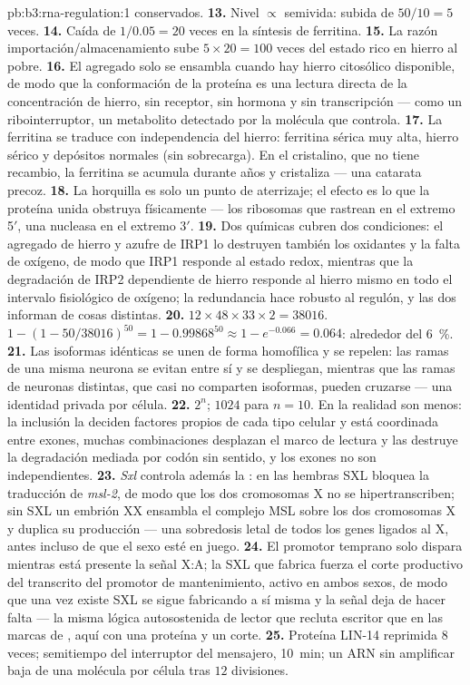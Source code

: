 \begin{solution}{pb:b3:rna-regulation:1}
conservados.
\textbf{13.} Nivel $\propto$ semivida: subida de $50/10 = 5$ veces.
\textbf{14.} Caída de $1/0.05 = 20$ veces en la síntesis de ferritina.
\textbf{15.} La razón importación/almacenamiento sube $5\times 20 = 100$
veces del estado rico en hierro al pobre.
\textbf{16.} El agregado solo se ensambla cuando hay hierro citosólico
disponible, de modo que la conformación de la proteína es una lectura
directa de la concentración de hierro, sin receptor, sin hormona y sin
transcripción --- como un ribointerruptor, un metabolito detectado por la
molécula que controla.
\textbf{17.} La ferritina se traduce con independencia del hierro:
ferritina sérica muy alta, hierro sérico y depósitos normales (sin
sobrecarga). En el cristalino, que no tiene recambio, la ferritina se
acumula durante años y cristaliza --- una catarata precoz.
\textbf{18.} La horquilla es solo un punto de aterrizaje; el efecto es lo
que la proteína unida obstruya físicamente --- los ribosomas que rastrean
en el extremo 5$'$, una nucleasa en el extremo 3$'$.
\textbf{19.} Dos químicas cubren dos condiciones: el agregado de hierro y
azufre de IRP1 lo destruyen también los oxidantes y la falta de oxígeno,
de modo que IRP1 responde al estado redox, mientras que la degradación de
IRP2 dependiente de hierro responde al hierro mismo en todo el intervalo
fisiológico de oxígeno; la redundancia hace robusto al regulón, y las dos
informan de cosas distintas.
\textbf{20.} $12\times 48\times 33\times 2 = \num{38016}$. $1 - (1 -
50/\num{38016})^{50} = 1 - 0.99868^{50} \approx 1 - e^{-0.066} =
0.064$: alrededor del \qty{6}{\%}.
\textbf{21.} Las isoformas idénticas se unen de forma homofílica y se
repelen: las ramas de una misma neurona se evitan entre sí y se
despliegan, mientras que las ramas de neuronas distintas, que casi no
comparten isoformas, pueden cruzarse --- una identidad privada por
célula.
\textbf{22.} $2^{n}$; $\num{1024}$ para $n = 10$. En la realidad son
menos: la inclusión la deciden factores propios de cada tipo celular y
está coordinada entre exones, muchas combinaciones desplazan el marco de
lectura y las destruye la degradación mediada por codón sin sentido, y
los exones no son independientes.
\textbf{23.} \emph{Sxl} controla además la : en las
hembras SXL bloquea la traducción de \emph{msl-2}, de modo que los dos
cromosomas X no se hipertranscriben; sin SXL un embrión XX ensambla el
complejo MSL sobre los dos cromosomas X y duplica su producción --- una
sobredosis letal de todos los genes ligados al X, antes incluso de que el
sexo esté en juego.
\textbf{24.} El promotor temprano solo dispara mientras está presente la
señal X:A; la SXL que fabrica fuerza el corte productivo del transcrito
del promotor de mantenimiento, activo en ambos sexos, de modo que una vez
existe SXL se sigue fabricando a sí misma y la señal deja de hacer falta
--- la misma lógica autosostenida de lector que recluta escritor que en
las marcas de , aquí con una proteína y un corte.
\textbf{25.} Proteína LIN-14 reprimida $8$ veces; semitiempo del
interruptor del mensajero, \qty{10}{min}; un ARN sin amplificar baja de
una molécula por célula tras $12$ divisiones.
\end{solution}
